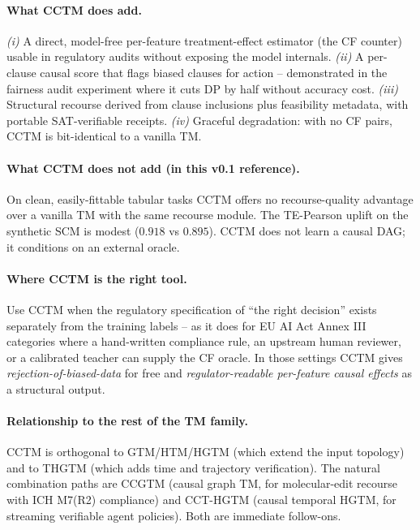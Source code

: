 \documentclass[11pt]{article}
\begin{document}
\paragraph{What CCTM does add.}  \emph{(i)} A direct, model-free per-feature treatment-effect estimator (the CF counter) usable in regulatory audits without exposing the model internals.  \emph{(ii)} A per-clause causal score that flags biased clauses for action -- demonstrated in the fairness audit experiment where it cuts DP by half without accuracy cost.  \emph{(iii)} Structural recourse derived from clause inclusions plus feasibility metadata, with portable SAT-verifiable receipts.  \emph{(iv)} Graceful degradation: with no CF pairs, CCTM is bit-identical to a vanilla TM.

\paragraph{What CCTM does not add (in this v0.1 reference).}  On clean, easily-fittable tabular tasks CCTM offers no recourse-quality advantage over a vanilla TM with the same recourse module.  The TE-Pearson uplift on the synthetic SCM is modest ($0.918$ vs $0.895$).  CCTM does not learn a causal DAG; it conditions on an external oracle.

\paragraph{Where CCTM is the right tool.}  Use CCTM when the regulatory specification of ``the right decision'' exists separately from the training labels -- as it does for EU AI Act Annex III categories where a hand-written compliance rule, an upstream human reviewer, or a calibrated teacher can supply the CF oracle.  In those settings CCTM gives \emph{rejection-of-biased-data} for free and \emph{regulator-readable per-feature causal effects} as a structural output.

\paragraph{Relationship to the rest of the TM family.}  CCTM is orthogonal to GTM/HTM/HGTM (which extend the input topology) and to THGTM (which adds time and trajectory verification).  The natural combination paths are CCGTM (causal graph TM, for molecular-edit recourse with ICH M7(R2) compliance) and CCT-HGTM (causal temporal HGTM, for streaming verifiable agent policies).  Both are immediate follow-ons.
\end{document}
